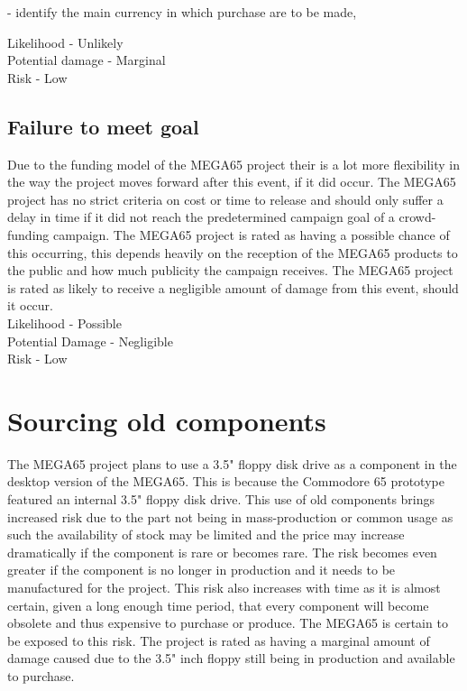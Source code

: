- identify the main currency in which purchase are to be made, 

Likelihood - Unlikely \\
Potential damage - Marginal \\
Risk - Low \\


\subsection{Failure to meet goal}
Due to the funding model of the MEGA65 project their is a lot more flexibility in the way the project moves forward after this event, if it did occur. The MEGA65 project has no strict criteria on cost or time to release and should only suffer a delay in time if it did not reach the predetermined campaign goal of a crowd-funding campaign. The MEGA65 project is rated as having a possible chance of this occurring, this depends heavily on the reception of the MEGA65 products to the public and how much publicity the campaign receives. The MEGA65 project is rated as likely to receive a negligible amount of damage from this event, should it occur. \\

Likelihood - Possible \\
Potential Damage - Negligible \\
Risk - Low \\


\section{Sourcing old components}
The MEGA65 project plans to use a 3.5" floppy disk drive as a component in the desktop version of the MEGA65. This is because the Commodore 65 prototype featured an internal 3.5" floppy disk drive. This use of old components brings increased risk due to the part not being in mass-production or common usage as such the availability of stock may be limited and the price may increase dramatically if the component is rare or becomes rare. The risk becomes even greater if the component is no longer in production and it needs to be manufactured for the project. This risk also increases with time as it is almost certain, given a long enough time period, that every component will become obsolete and thus expensive to purchase or produce. The MEGA65 is certain to be exposed to this risk. The project is rated as having a marginal amount of damage caused due to the 3.5" inch floppy still being in production and available to purchase. \\

